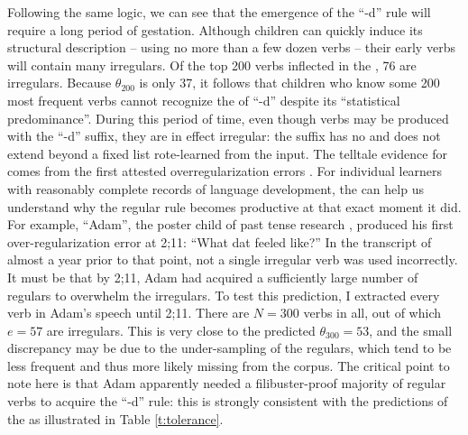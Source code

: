 \documentclass[output=paper,
modfonts
]{LSP/langsci}
\begin{document}
\newpage 
Following the same logic, we can see that the emergence of the ``-d''
rule will require a long period of gestation. Although children  can quickly
induce its structural description -- using no more than a few dozen verbs
\citep[again][]{Yip1998a} -- their early verbs will contain 
many irregulars.  Of the top
200 verbs inflected in the  \citep{CHILDES}, 76 are
irregulars. Because  $\theta_{200}$ is only 37, 
it follows that children who know some 200 most frequent verbs cannot
recognize  the  of ``-d'' despite its ``statistical
predominance''. During this period of time, even though verbs may be
produced with the ``-d'' suffix, they are in 
effect irregular: the suffix has no  and does not
extend beyond a fixed list rote-learned from the input. The telltale
evidence for  comes from the first attested overregularization
errors \citep{Marcus1992}. For individual learners with reasonably
complete records of language development,  the  can
help us understand  why the regular rule becomes productive at that
exact moment it did. For example, ``Adam'', the poster child of  past
tense research \citep{Pinker1999}, produced his first
over-regularization error at 2;11: ``What dat feeled like?'' In the
transcript of almost a year prior to that point, not a single
irregular verb  was used incorrectly. It must be 
that by 2;11, Adam had acquired a sufficiently large number of
regulars to overwhelm the irregulars. To test this prediction, I
extracted every verb  in Adam's speech until 2;11. There are $N =
300$ verbs in all, out of which $e = 57$ are irregulars. This is very
close to the predicted $\theta_{300} = 53$, and the small discrepancy
may be due to the under-sampling of the regulars,  which tend to be
less frequent and thus  more likely missing  from the corpus. The critical
point to note here is that Adam apparently needed 
a filibuster-proof majority of regular verbs to acquire the ``-d''
rule:  this is strongly consistent with the predictions of the
 as illustrated in Table \ref{t:tolerance}. 
\end{document}
